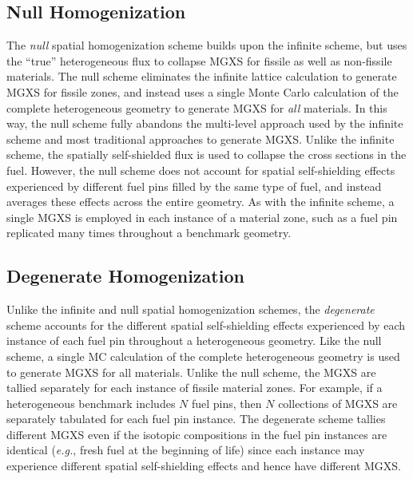 
\subsection{Null Homogenization}
\label{subsec:chap8-null}

The \textit{null} spatial homogenization scheme builds upon the infinite scheme, but uses the ``true'' heterogeneous flux to collapse \ac{MGXS} for fissile as well as non-fissile materials. The null scheme eliminates the infinite lattice calculation to generate \ac{MGXS} for fissile zones, and instead uses a single Monte Carlo calculation of the complete heterogeneous geometry to generate \ac{MGXS} for \textit{all} materials. In this way, the null scheme fully abandons the multi-level approach used by the infinite scheme and most traditional approaches to generate \ac{MGXS}. Unlike the infinite scheme, the spatially self-shielded flux is used to collapse the cross sections in the fuel. However, the null scheme does not account for spatial self-shielding effects experienced by different fuel pins filled by the same type of fuel, and instead averages these effects across the entire geometry. As with the infinite scheme, a single \ac{MGXS} is employed in each instance of a material zone, such as a fuel pin replicated many times throughout a benchmark geometry.

\subsection{Degenerate Homogenization}
\label{subsec:chap8-degenerate}

Unlike the infinite and null spatial homogenization schemes, the \textit{degenerate} scheme accounts for the different spatial self-shielding effects experienced by each instance of each fuel pin throughout a heterogeneous geometry. Like the null scheme, a single \ac{MC} calculation of the complete heterogeneous geometry is used to generate \ac{MGXS} for all materials. Unlike the null scheme, the \ac{MGXS} are tallied separately for each instance of fissile material zones. For example, if a heterogeneous benchmark includes $N$ fuel pins, then $N$ collections of \ac{MGXS} are separately tabulated for each fuel pin instance. The degenerate scheme tallies different \ac{MGXS} even if the isotopic compositions in the fuel pin instances are identical (\textit{e.g.}, fresh fuel at the beginning of life) since each instance may experience different spatial self-shielding effects and hence have different \ac{MGXS}.

